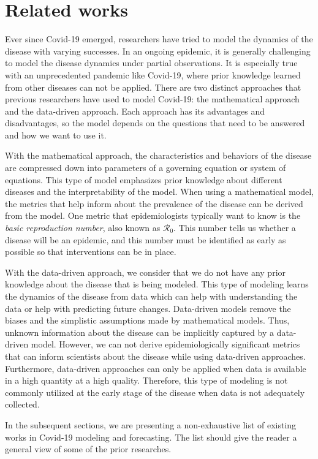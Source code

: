 \section{Related works}

Ever since Covid-19 emerged, researchers have tried to model the dynamics of the disease with varying successes.
In an ongoing epidemic, it is generally challenging to model the disease dynamics under partial observations.
It is especially true with an unprecedented pandemic like Covid-19, where prior knowledge learned from other diseases can not be applied.
There are two distinct approaches that previous researchers have used to model Covid-19: the mathematical approach and the data-driven approach.
Each approach has its advantages and disadvantages, so the model depends on the questions that need to be answered and how we want to use it.

With the mathematical approach, the characteristics and behaviors of the disease are compressed down into parameters of a governing equation or system of equations.
This type of model emphasizes prior knowledge about different diseases and the interpretability of the model.
When using a mathematical model, the metrics that help inform about the prevalence of the disease can be derived from the model.
One metric that epidemiologists typically want to know is the \textit{basic reproduction number}, also known as $\mathcal{R}_0$.
This number tells us whether a disease will be an epidemic, and this number must be identified as early as possible so that interventions can be in place.

With the data-driven approach, we consider that we do not have any prior knowledge about the disease that is being modeled.
This type of modeling learns the dynamics of the disease from data which can help with understanding the data or help with predicting future changes.
Data-driven models remove the biases and the simplistic assumptions made by mathematical models.
Thus, unknown information about the disease can be implicitly captured by a data-driven model.
However, we can not derive epidemiologically significant metrics that can inform scientists about the disease while using data-driven approaches.
Furthermore, data-driven approaches can only be applied when data is available in a high quantity at a high quality.
Therefore, this type of modeling is not commonly utilized at the early stage of the disease when data is not adequately collected.

In the subsequent sections, we are presenting a non-exhaustive list of existing works in Covid-19 modeling and forecasting.
The list should give the reader a general view of some of the prior researches.

